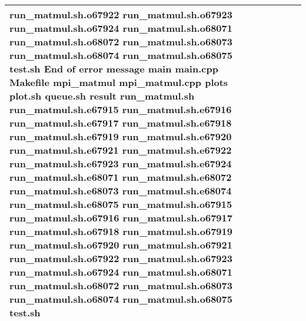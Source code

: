 \documentclass{article}
\begin{document}
\begin{tabular} { | l | l | l | l | l | l | }
run_matmul.sh.o67922 run_matmul.sh.o67923 run_matmul.sh.o67924 run_matmul.sh.o68071 run_matmul.sh.o68072 run_matmul.sh.o68073 run_matmul.sh.o68074 run_matmul.sh.o68075 test.sh End of error message main main.cpp Makefile mpi_matmul mpi_matmul.cpp plots plot.sh queue.sh result run_matmul.sh run_matmul.sh.e67915 run_matmul.sh.e67916 run_matmul.sh.e67917 run_matmul.sh.e67918 run_matmul.sh.e67919 run_matmul.sh.e67920 run_matmul.sh.e67921 run_matmul.sh.e67922 run_matmul.sh.e67923 run_matmul.sh.e67924 run_matmul.sh.e68071 run_matmul.sh.e68072 run_matmul.sh.e68073 run_matmul.sh.e68074 run_matmul.sh.e68075 run_matmul.sh.o67915 run_matmul.sh.o67916 run_matmul.sh.o67917 run_matmul.sh.o67918 run_matmul.sh.o67919 run_matmul.sh.o67920 run_matmul.sh.o67921 run_matmul.sh.o67922 run_matmul.sh.o67923 run_matmul.sh.o67924 run_matmul.sh.o68071 run_matmul.sh.o68072 run_matmul.sh.o68073 run_matmul.sh.o68074 run_matmul.sh.o68075 test.sh \\ \hline

\end{tabular}
\end{document}
